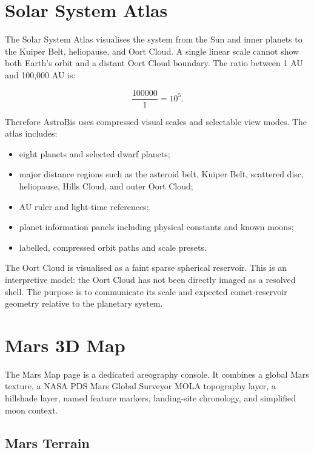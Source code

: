 \documentclass[11pt,a4paper]{article}
\begin{document}
\section{Solar System Atlas}

The Solar System Atlas visualises the system from the Sun and inner planets to the Kuiper Belt, heliopause, and Oort Cloud. A single linear scale cannot show both Earth's orbit and a distant Oort Cloud boundary. The ratio between 1 AU and 100,000 AU is:

\begin{equation}
\frac{100000}{1}=10^5.
\end{equation}

Therefore AstroBis uses compressed visual scales and selectable view modes. The atlas includes:

\begin{itemize}[leftmargin=*]
  \item eight planets and selected dwarf planets;
  \item major distance regions such as the asteroid belt, Kuiper Belt, scattered disc, heliopause, Hills Cloud, and outer Oort Cloud;
  \item AU ruler and light-time references;
  \item planet information panels including physical constants and known moons;
  \item labelled, compressed orbit paths and scale presets.
\end{itemize}

The Oort Cloud is visualised as a faint sparse spherical reservoir. This is an interpretive model: the Oort Cloud has not been directly imaged as a resolved shell. The purpose is to communicate its scale and expected comet-reservoir geometry relative to the planetary system.

\section{Mars 3D Map}

The Mars Map page is a dedicated areography console. It combines a global Mars texture, a NASA PDS Mars Global Surveyor MOLA topography layer, a hillshade layer, named feature markers, landing-site chronology, and simplified moon context.

\subsection{Mars Terrain}
\end{document}
